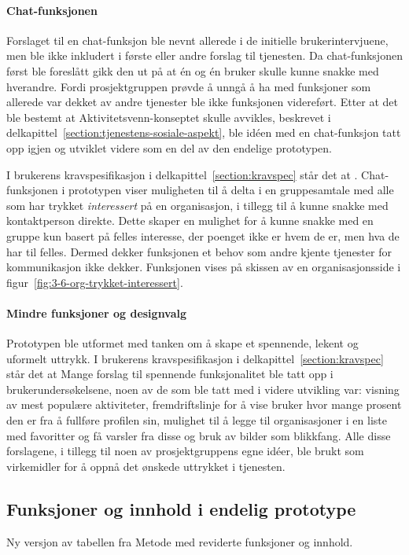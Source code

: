 \paragraph{Chat-funksjonen}
Forslaget til en chat-funksjon ble nevnt allerede i de initielle brukerintervjuene, men ble ikke inkludert i første eller andre forslag til tjenesten. Da chat-funksjonen først ble foreslått gikk den ut på at én og én bruker skulle kunne snakke med hverandre. Fordi prosjektgruppen prøvde å unngå å ha med funksjoner som allerede var dekket av andre tjenester ble ikke funksjonen videreført. Etter at det ble bestemt at Aktivitetsvenn-konseptet skulle avvikles, beskrevet i delkapittel~\ref{section:tjenestens-sosiale-aspekt}, ble idéen med en chat-funksjon tatt opp igjen og utviklet videre som en del av den endelige prototypen. 

I brukerens kravspesifikasjon i delkapittel~\ref{section:kravspec} står det at . Chat-funksjonen i prototypen viser muligheten til å delta i en gruppesamtale med alle som har trykket {\em interessert} på en organisasjon, i tillegg til å kunne snakke med kontaktperson direkte. Dette skaper en mulighet for å kunne snakke med en gruppe kun basert på felles interesse, der poenget ikke er hvem de er, men hva de har til felles. Dermed dekker funksjonen et behov som andre kjente tjenester for kommunikasjon ikke dekker. Funksjonen vises på skissen av en organisasjonsside i figur~\ref{fig:3-6-org-trykket-interessert}.

\paragraph{Mindre funksjoner og designvalg}
Prototypen ble utformet med tanken om å skape et spennende, lekent og uformelt uttrykk. I brukerens kravspesifikasjon i delkapittel~\ref{section:kravspec} står det at  Mange forslag til spennende funksjonalitet ble tatt opp i brukerundersøkelsene, noen av de som ble tatt med i videre utvikling var: visning av mest populære aktiviteter, fremdriftslinje for å vise bruker hvor mange prosent den er fra å fullføre profilen sin, mulighet til å legge til organisasjoner i en liste med favoritter og få varsler fra disse og bruk av bilder som blikkfang. Alle disse forslagene, i tillegg til noen av prosjektgruppens egne idéer, ble brukt som virkemidler for å oppnå det ønskede uttrykket i tjenesten.

\subsection{Funksjoner og innhold i endelig prototype}
Ny versjon av tabellen fra Metode med reviderte funksjoner og innhold.

